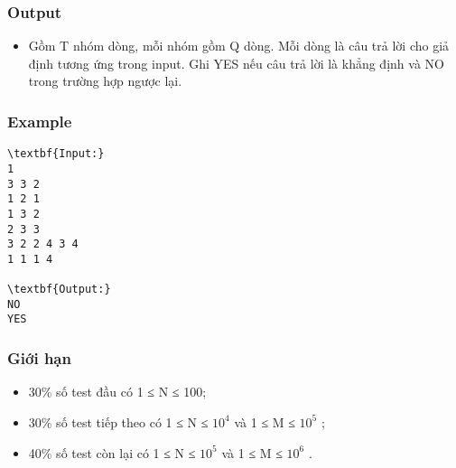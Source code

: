 \subsubsection{Output}
\begin{itemize}
	\item Gồm T nhóm dòng, mỗi nhóm gồm Q dòng. Mỗi dòng là câu trả lời cho giả định tương ứng trong input. Ghi YES nếu câu trả lời là khẳng định và NO trong trường hợp ngược lại.
\end{itemize}

\subsubsection{Example}
\begin{verbatim}
\textbf{Input:}
1
3 3 2
1 2 1
1 3 2
2 3 3
3 2 2 4 3 4
1 1 1 4

\textbf{Output:}
NO
YES\end{verbatim}

\subsubsection{Giới hạn}
\begin{itemize}
	\item 30\% số test đầu có 1 ≤ N ≤ 100;
	\item 30\% số test tiếp theo có 1 ≤ N ≤ $10^{4}$ và 1 ≤ M ≤ $10^{5}$ ;
	\item 40\% số test còn lại có 1 ≤ N ≤ $10^{5}$ và 1 ≤ M ≤ $10^{6}$ .
\end{itemize}
